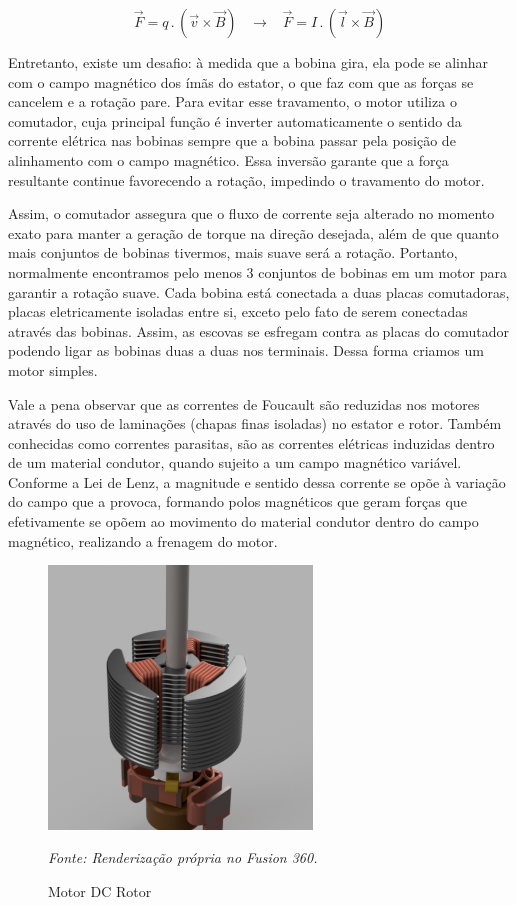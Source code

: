\documentclass[11pt]{article}
\begin{document}
    \begin{equation}
        \nonumber
        \label{eqlorentz}
        \vec{F} = q \,.\, ( \vec{v} \times \vec{B}) \;\;\; \rightarrow \;\;\; \vec{F} = I \,.\, (\vec{l} \times \vec{B})
    \end{equation}

    Entretanto, existe um desafio: à medida que a bobina gira, ela pode se alinhar com o campo magnético dos ímãs do estator, o que faz com que as forças se cancelem e a 
    rotação pare. Para evitar esse travamento, o motor utiliza o comutador, cuja principal função é inverter automaticamente o sentido da corrente elétrica 
    nas bobinas sempre que a bobina passar pela posição de alinhamento com o campo magnético. Essa inversão garante que a força resultante continue favorecendo a rotação, 
    impedindo o travamento do motor. 
    
    Assim, o comutador assegura que o fluxo de corrente seja alterado no momento exato para manter a geração de torque na direção desejada, além de que quanto mais conjuntos 
    de bobinas tivermos, mais suave será a rotação. Portanto, normalmente encontramos pelo menos 3 conjuntos de bobinas em um motor para garantir a rotação suave. Cada 
    bobina está conectada a duas placas comutadoras, placas eletricamente isoladas entre si, exceto pelo fato de serem conectadas através das bobinas. Assim, as escovas se 
    esfregam contra as placas do comutador podendo ligar as bobinas duas a duas nos terminais. Dessa forma criamos um motor simples.

    Vale a pena observar que as correntes de Foucault são reduzidas nos motores através do uso de laminações (chapas finas isoladas) no estator e rotor.
    Também conhecidas como correntes parasitas, são as correntes elétricas induzidas dentro de um material condutor, quando sujeito a um campo magnético variável. 
    Conforme a Lei de Lenz, a magnitude e sentido dessa corrente se opõe à variação do campo que a provoca, formando polos magnéticos que geram forças 
    que efetivamente se opõem ao movimento do material condutor dentro do campo magnético, realizando a frenagem do motor.
    
    \bigskip
    \bigskip

    \begin{figure}[H]
        \centering
        \includegraphics[width=7cm]{Renderizações/4 - DC.png}
        \caption{Motor DC Rotor}
        \footnotesize \textit{Fonte: Renderização própria no Fusion 360.}
        \label{4-DC}
    \end{figure}
\end{document}
